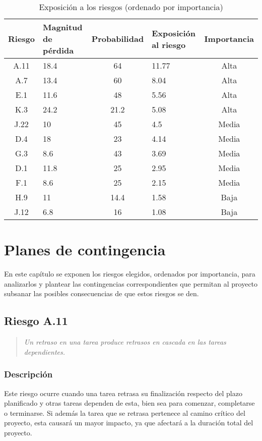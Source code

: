 \documentclass[11pt,a4paper,spanish,twoside]{book}
\begin{document}
\begin{table}[!h]
  \centering
  \begin{tabular}{|c|b{2.1cm}<{\centering}|c|b{2cm}<{\centering}|c|}
    \hline
    \textbf{Riesgo} & \textbf{Magnitud de pérdida} & \textbf{Probabilidad} & 
    \textbf{Exposición al riesgo} & \textbf{Importancia} \\
    \hline \hline
    A.11 & 18.4 & 64   & 11.77 & Alta  \\ \hline
    A.7  & 13.4 & 60   & 8.04  & Alta  \\ \hline 
    E.1  & 11.6 & 48   & 5.56  & Alta  \\ \hline
    K.3  & 24.2 & 21.2 & 5.08  & Alta  \\ \hline
    J.22 & 10   & 45   & 4.5   & Media \\ \hline
    D.4  & 18   & 23   & 4.14  & Media \\ \hline
    G.3  & 8.6  & 43   & 3.69  & Media \\ \hline
    D.1  & 11.8 & 25   & 2.95  & Media \\ \hline
    F.1  & 8.6  & 25   & 2.15  & Media \\ \hline
    H.9  & 11   & 14.4 & 1.58  & Baja  \\ \hline
    J.12 & 6.8  & 16   & 1.08  & Baja  \\ \hline
  \end{tabular}
  \caption{Exposición a los riesgos (ordenado por importancia)} 
  \label{Tab:Expor}
\end{table}

\chapter{Planes de contingencia}
En este capítulo se exponen los riesgos elegidos, ordenados por importancia,
para analizarlos y plantear las contingencias correspondientes que permitan
al proyecto subsanar las posibles consecuencias de que estos riesgos se den.

\section{Riesgo A.11}
\begin{quote}
  \emph{Un retraso en una tarea produce retrasos en cascada en las tareas
    dependientes.} 
\end{quote}

\subsection{Descripción}
Este riesgo ocurre cuando una tarea retrasa su finalización respecto del plazo
planificado y otras tareas dependen de esta, bien sea para comenzar, 
completarse o terminarse. Si además la tarea que se retrasa pertenece al camino
crítico del proyecto, esta causará un mayor impacto, ya que afectará
a la duración total del proyecto.
\end{document}
